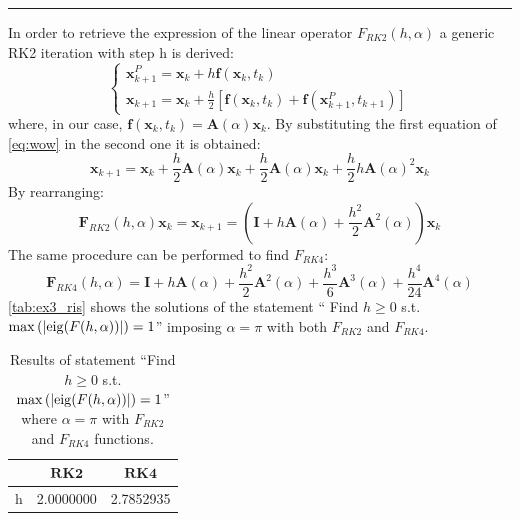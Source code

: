\documentclass[11pt,a4paper,oneside]{article}
\renewcommand{\vec}[1]{\mathbf{#1}}
\begin{document}
\medskip \hrule \medskip

In order to retrieve the expression of the linear operator $F_{RK2}(h,\alpha)$ a generic RK2 iteration with step h is derived:
\begin{equation}
    \begin{cases}
        \vec{x}_{k+1}^P = \vec{x}_k + h\vec{f}(\vec{x}_k, t_k)\\
        \vec{x}_{k+1} = \vec{x}_k + \frac{h}{2}[\vec{f}(\vec{x}_k,t_k)+\vec{f}(\vec{x}_{k+1}^P, t_{k+1})]
    \end{cases}
    \label{eq:wow}
\end{equation}
where, in our case, $\vec{f}(\vec{x}_k, t_k) = \vec{A}(\alpha)\vec{x}_k$. By substituting the 
first equation of \autoref{eq:wow} in the second one it is obtained:
\begin{equation}
    \vec{x}_{k+1} = \vec{x}_k + \frac{h}{2}\vec{A}(\alpha)\vec{x}_k + \frac{h}{2}\vec{A}(\alpha)\vec{x}_k + \frac{h}{2}h\vec{A}(\alpha)^2\vec{x}_k
\end{equation}
By rearranging:
\begin{equation}
    \vec{F}_{RK2}(h,\alpha)\vec{x}_k = \vec{x}_{k+1} = (\vec{I} + h\vec{A}(\alpha) + \frac{h^2}{2}\vec{A}^2(\alpha))\vec{x}_k 
\end{equation}
The same procedure can be performed to find $F_{RK4}$:
\begin{equation}
    \vec{F}_{RK4}(h,\alpha) = \vec{I} + h\vec{A}(\alpha) + \frac{h^2}{2}\vec{A}^2(\alpha) +  \frac{h^3}{6}\vec{A}^3(\alpha) + \frac{h^4}{24}\vec{A}^4(\alpha)
\end{equation}
\autoref{tab:ex3_ris} shows the solutions of the statement ``
Find $h\ge 0$ s.t.$\max\left(|{\rm eig}(F(h,\alpha))|\right) = 1$'' 
imposing $\alpha=\pi$ with both $F_{RK2}$ and $F_{RK4}$.
\begin{table}[h]
    \centering
    \begin{tabular}{l | c c}
         & $\vec{RK2}$ &  $\vec{RK4}$\\
        \midrule \midrule
        h & 2.0000000 & 2.7852935
    \end{tabular}
    \caption{Results of statement ``Find $h\ge 0$ s.t.$\max\left(|{\rm eig}(F(h,\alpha))|\right) = 1$'' where  $\alpha=\pi$ with $F_{RK2}$ and $F_{RK4}$ functions.}
    \label{tab:ex3_ris}
\end{table}
\end{document}
